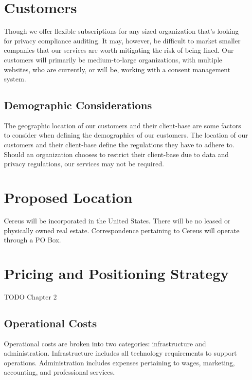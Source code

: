 
\section{Customers}

Though we offer flexible subscriptions for any sized organization that's looking for privacy compliance auditing. It may, however, be difficult to market smaller companies that our services are worth mitigating the risk of being fined. Our customers will primarily be medium-to-large organizations, with multiple websites, who are currently, or will be, working with a consent management system.

\subsection{Demographic Considerations}

The geographic location of our customers and their client-base are some factors to consider when defining the demographics of our customers. The location of our customers and their client-base define the regulations they have to adhere to. Should an organization chooses to restrict their client-base due to data and privacy regulations, our services may not be required.


\section{Proposed Location}

Cereus will be incorporated in the United States. There will be no leased or physically owned real estate. Correspondence pertaining to Cereus will operate through a PO Box. 


\section{Pricing and Positioning Strategy}

TODO Chapter 2

\subsection{Operational Costs}

Operational costs are broken into two categories: infrastructure and administration. Infrastructure includes all technology requirements to support operations. Administration includes expenses pertaining to wages, marketing, accounting, and professional services.


